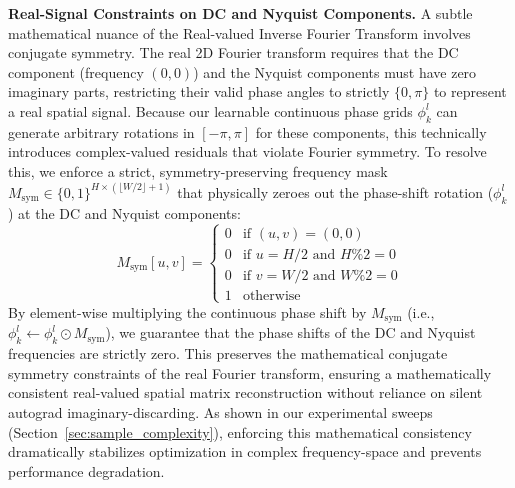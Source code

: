 \textbf{Real-Signal Constraints on DC and Nyquist Components.} A subtle mathematical nuance of the Real-valued Inverse Fourier Transform involves conjugate symmetry. The real 2D Fourier transform requires that the DC component (frequency $(0,0)$) and the Nyquist components must have zero imaginary parts, restricting their valid phase angles to strictly $\{0, \pi\}$ to represent a real spatial signal. Because our learnable continuous phase grids $\phi_k^l$ can generate arbitrary rotations in $[-\pi, \pi]$ for these components, this technically introduces complex-valued residuals that violate Fourier symmetry. To resolve this, we enforce a strict, symmetry-preserving frequency mask $M_{\text{sym}} \in \{0, 1\}^{H \times (\lfloor W/2 \rfloor + 1)}$ that physically zeroes out the phase-shift rotation ($\phi_k^l$) at the DC and Nyquist components:
\begin{equation}
    M_{\text{sym}}[u, v] = \begin{cases} 
    0 & \text{if } (u, v) = (0,0) \\
    0 & \text{if } u = H/2 \text{ and } H \% 2 = 0 \\
    0 & \text{if } v = W/2 \text{ and } W \% 2 = 0 \\
    1 & \text{otherwise}
    \end{cases}
\end{equation}
By element-wise multiplying the continuous phase shift by $M_{\text{sym}}$ (i.e., $\phi_k^l \leftarrow \phi_k^l \odot M_{\text{sym}}$), we guarantee that the phase shifts of the DC and Nyquist frequencies are strictly zero. This preserves the mathematical conjugate symmetry constraints of the real Fourier transform, ensuring a mathematically consistent real-valued spatial matrix reconstruction without reliance on silent autograd imaginary-discarding. As shown in our experimental sweeps (Section~\ref{sec:sample_complexity}), enforcing this mathematical consistency dramatically stabilizes optimization in complex frequency-space and prevents performance degradation.

